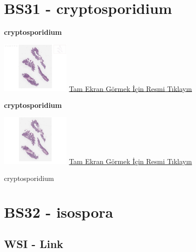 \documentclass[
  letterpaper,
  DIV=11,
  numbers=noendperiod]{scrreprt}
\begin{document}
\hypertarget{sec-BS31}{%
\section{BS31 - cryptosporidium}\label{sec-BS31}}

\textbf{cryptosporidium}

\href{https://images.patolojiatlasi.com/BS31/HE1.html}{\includegraphics[width=0.25\textwidth,height=\textheight]{./screenshots/BS31-HE1_screenshot.png}}
\href{https://images.patolojiatlasi.com/BS31/HE1.html}{Tam Ekran Görmek
İçin Resmi Tıklayın}

\textbf{cryptosporidium}

\href{https://images.patolojiatlasi.com/BS31/HE2.html}{\includegraphics[width=0.25\textwidth,height=\textheight]{./screenshots/BS31-HE2_screenshot.png}}
\href{https://images.patolojiatlasi.com/BS31/HE2.html}{Tam Ekran Görmek
İçin Resmi Tıklayın}

\begin{tcolorbox}[enhanced jigsaw, left=2mm, toprule=.15mm, rightrule=.15mm, bottomrule=.15mm, leftrule=.75mm, colback=white, colframe=quarto-callout-tip-color-frame, toptitle=1mm, breakable, titlerule=0mm, colbacktitle=quarto-callout-tip-color!10!white, bottomtitle=1mm, title=\textcolor{quarto-callout-tip-color}{\faLightbulb}\hspace{0.5em}{Tanı}, arc=.35mm, opacitybacktitle=0.6, opacityback=0, coltitle=black]

cryptosporidium

\end{tcolorbox}

\hypertarget{sec-BS32}{%
\section{BS32 - isospora}\label{sec-BS32}}

\subsection{WSI - Link}
\end{document}
